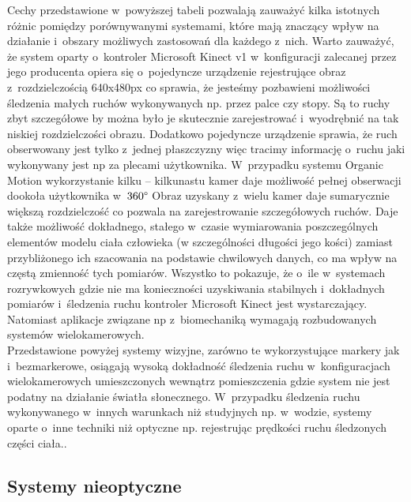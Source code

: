 Cechy przedstawione w~powyższej tabeli pozwalają zauważyć kilka istotnych różnic pomiędzy porównywanymi systemami, które mają znaczący wpływ na działanie i~obszary możliwych zastosowań dla każdego z~nich. Warto zauważyć, że system oparty o~kontroler Microsoft Kinect v1 w~konfiguracji zalecanej przez jego producenta opiera się o~pojedyncze urządzenie rejestrujące obraz z~rozdzielczością 640x480px co sprawia, że jesteśmy pozbawieni możliwości śledzenia małych ruchów wykonywanych np. przez palce czy stopy. Są to ruchy zbyt szczegółowe by można było je skutecznie zarejestrować i~wyodrębnić na tak niskiej rozdzielczości obrazu. Dodatkowo pojedyncze urządzenie sprawia, że ruch obserwowany jest tylko z~jednej płaszczyzny więc tracimy informację o~ruchu jaki wykonywany jest np za plecami użytkownika. W~przypadku systemu Organic Motion wykorzystanie kilku -- kilkunastu kamer daje możliwość pełnej obserwacji dookoła użytkownika w~$360\degree$ Obraz uzyskany z~wielu kamer daje sumarycznie większą rozdzielczość co pozwala na zarejestrowanie szczegółowych ruchów. Daje także możliwość dokładnego, stałego w~czasie wymiarowania poszczególnych elementów modelu ciała człowieka (w szczególności długości jego kości) zamiast przybliżonego ich szacowania na podstawie chwilowych danych, co ma wpływ na częstą zmienność tych pomiarów. Wszystko to pokazuje, że o~ile w~systemach rozrywkowych gdzie nie ma konieczności uzyskiwania stabilnych i~dokładnych pomiarów i~śledzenia ruchu kontroler Microsoft Kinect jest wystarczający. Natomiast aplikacje związane np z~biomechaniką wymagają rozbudowanych systemów wielokamerowych.\\

Przedstawione powyżej systemy wizyjne, zarówno te wykorzystujące markery jak i~bezmarkerowe, osiągają wysoką dokładność śledzenia ruchu w~konfiguracjach wielokamerowych umieszczonych wewnątrz pomieszczenia gdzie system nie jest podatny na działanie światła słonecznego. W~przypadku śledzenia ruchu wykonywanego w~innych warunkach niż studyjnych np. w~wodzie, systemy oparte o~inne techniki niż optyczne np. rejestrując prędkości ruchu śledzonych części ciała..

\subsection{Systemy nieoptyczne}

